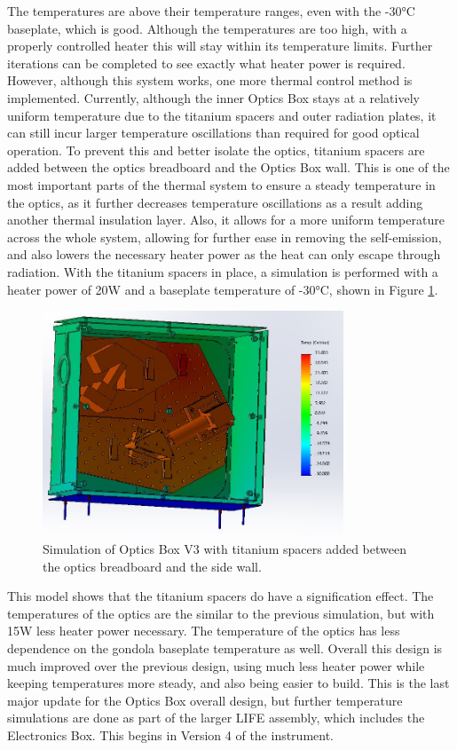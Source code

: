 The temperatures are above their temperature ranges, even with the -30°C baseplate, which is good. Although the temperatures are too high, with a properly controlled heater this will stay within its temperature limits. Further iterations can be completed to see exactly what heater power is required. However, although this system works, one more thermal control method is implemented. Currently, although the inner Optics Box stays at a relatively uniform temperature due to the titanium spacers and outer radiation plates, it can still incur larger temperature oscillations than required for good optical operation. To prevent this and better isolate the optics, titanium spacers are added between the optics breadboard and the Optics Box wall. This is one of the most important parts of the thermal system to ensure a steady temperature in the optics, as it further decreases temperature oscillations as a result adding another thermal insulation layer. Also, it allows for a more uniform temperature across the whole system, allowing for further ease in removing the self-emission, and also lowers the necessary heater power as the heat can only escape through radiation. With the titanium spacers in place, a simulation is performed with a heater power of 20W and a baseplate temperature of -30°C, shown in Figure \ref{fig:OB_V3_TA_3_SPACERS_ADDED}.

\begin{figure}
    \centering
    \includegraphics[width=0.8\textwidth]{chap3_images/LIFE_V3_images/TA_-30_deg_20W_heater_isolated_board.JPG}
    \caption{Simulation of Optics Box V3 with titanium spacers added between the optics breadboard and the side wall.}
    \label{fig:OB_V3_TA_3_SPACERS_ADDED}
\end{figure}

This model shows that the titanium spacers do have a signification effect. The temperatures of the optics are the similar to the previous simulation, but with 15W less heater power necessary. The temperature of the optics has less dependence on the gondola baseplate temperature as well. Overall this design is much improved over the previous design, using much less heater power while keeping temperatures more steady, and also being easier to build. This is the last major update for the Optics Box overall design, but further temperature simulations are done as part of the larger LIFE assembly, which includes the Electronics Box. This begins in Version 4 of the instrument.

